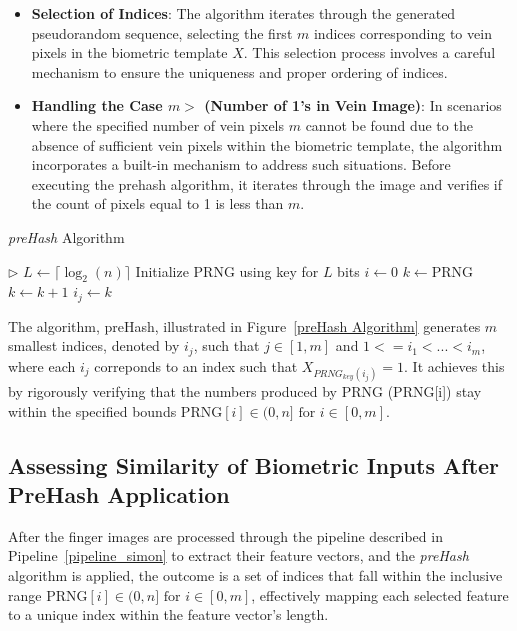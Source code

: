 \begin{itemize}
    \item \textbf{Selection of Indices}: The algorithm iterates through the generated pseudorandom sequence, selecting the first \(m\) indices corresponding to vein pixels in the biometric template \(X\). This selection process involves a careful mechanism to ensure the uniqueness and proper ordering of indices.

    \item \textbf{Handling the Case \(m >\) (Number of 1's in Vein Image)}: In scenarios where the specified number of vein pixels \(m\) cannot be found due to the absence of sufficient vein pixels within the biometric template, the algorithm incorporates a built-in mechanism to address such situations. Before executing the prehash algorithm, it iterates through the image and verifies if the count of pixels equal to 1 is less than \(m\).

\end{itemize}


\begin{algorithm}
\begin{algorithmic}[1]
\caption{\textit{preHash} Algorithm}
\label{preHash Algorithm}
\State \hfill $\triangleright$ $L \gets \lceil \log_2(n) \rceil$
\State Initialize PRNG using key for $L$ bits
\State $i \gets 0$
    \Repeat
        \Repeat
            \State $k \gets \text{PRNG}$
        \State $k \gets k + 1$
    \State $i_j \gets k$
    \EndFor
\State {}
\EndFunction
\end{algorithmic}
\end{algorithm}

The algorithm, preHash, illustrated in Figure~\ref{preHash Algorithm} generates \(m\) smallest indices, denoted by \(i_j\), such that \(j\in{[1, m]} \) and \(1 <= i_1 < ... < i_m\), where each \(i_j\) correponds to an index such that \(X_{PRNG_{key}(i_j)} = 1\). It achieves this by rigorously verifying that the numbers produced by PRNG (PRNG[i]) stay within the specified bounds \(\text{PRNG}[i] \in (0, n] \text{ for } i \in [0, m]\).

\subsection{Assessing Similarity of Biometric Inputs After PreHash Application}
\label{sec:mu}

After the finger images are processed through the pipeline described in Pipeline~\ref{pipeline_simon} to extract their feature vectors, and the \textit{preHash} algorithm is applied, the outcome is a set of indices that fall within the inclusive range \(\text{PRNG}[i] \in (0, n] \text{ for } i \in [0, m]\), effectively mapping each selected feature to a unique index within the feature vector's length.

